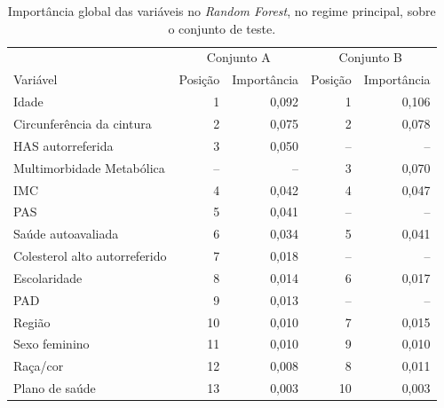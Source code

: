 \begin{table}[htb]
  \centering
  \caption{\label{tab:shap-global}Importância global das variáveis no \textit{Random Forest}, no regime principal, sobre o conjunto de teste.}
  \small
  \begin{tabular}{lrrrr}
    \hline
    & \multicolumn{2}{c}{Conjunto A} & \multicolumn{2}{c}{Conjunto B} \\
    Variável & Posição & Importância & Posição & Importância \\ \hline
    Idade & 1 & 0,092 & 1 & 0,106 \\
    Circunferência da cintura & 2 & 0,075 & 2 & 0,078 \\
    HAS autorreferida & 3 & 0,050 & -- & -- \\
    Multimorbidade Metabólica & -- & -- & 3 & 0,070 \\
    IMC & 4 & 0,042 & 4 & 0,047 \\
    PAS & 5 & 0,041 & -- & -- \\
    Saúde autoavaliada & 6 & 0,034 & 5 & 0,041 \\
    Colesterol alto autorreferido & 7 & 0,018 & -- & -- \\
    Escolaridade & 8 & 0,014 & 6 & 0,017 \\
    PAD & 9 & 0,013 & -- & -- \\
    Região & 10 & 0,010 & 7 & 0,015 \\
    Sexo feminino & 11 & 0,010 & 9 & 0,010 \\
    Raça/cor & 12 & 0,008 & 8 & 0,011 \\
    Plano de saúde & 13 & 0,003 & 10 & 0,003 \\ \hline
  \end{tabular}
\end{table}

